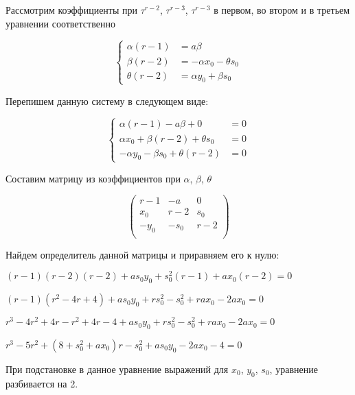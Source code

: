 Рассмотрим коэффициенты при $ \tau^{r-2} $, $ \tau^{r-3} $, $ \tau^{r-3} $ в первом, во втором и в третьем уравнении соответственно

\begin{equation*}
\label{eq:step2_coeff}
	\left\{
		\begin{aligned}
			\alpha (r-1) &= a \beta \\
			\beta  (r-2) &= -\alpha x_0 - \theta s_0 \\
			\theta (r-2) &= \alpha y_0 + \beta s_0
		\end{aligned}
	\right.
\end{equation*}

\newpage

Перепишем данную систему в следующем виде:

\begin{equation*}
\label{eq:step2_coeff_determinant}
	\left\{
		\begin{aligned}
			\alpha (r-1) - a \beta + 0 &= 0 \\
			\alpha x_0 + \beta (r-2) + \theta s_0 &= 0 \\
			-\alpha y_0	- \beta s_0 + \theta (r-2) &= 0 
		\end{aligned}
	\right.
\end{equation*}

Составим матрицу из коэффициентов при $ \alpha $, $ \beta $, $ \theta $ 

\begin{equation}
\label{eq:determinant}
	\left(
		\begin{array}{ccc}
			r-1 & -a & 0 \\
			x_0 & r-2 & s_0 \\
			-y_0 & -s_0 & r-2 \\
		\end{array}
	\right)
\end{equation}

Найдем определитель данной матрицы и приравняем его к нулю:

$ (r-1)(r-2)(r-2) + as_0y_0 + s^2_0(r-1) + ax_0(r-2) = 0 $

$ (r-1)(r^2-4r+4) + as_0y_0 + rs^2_0 - s^2_0 + rax_0 - 2ax_0 = 0 $

$ r^3 - 4r^2 + 4r - r^2 + 4r - 4 + as_0y_0 + rs^2_0 - s^2_0 + rax_0 - 2ax_0 = 0 $

$ r^3 - 5r^2 + (8 + s^2_0 + ax_0)r - s^2_0 + as_0y_0 - 2ax_0 - 4 = 0 $

При подстановке в данное уравнение выражений для $ x_0 $, $ y_0 $, $ s_0 $, уравнение разбивается на 2.

